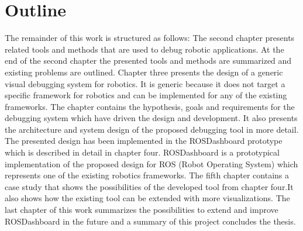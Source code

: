 \section{Outline}
The remainder of this work is structured as follows: The second chapter presents related tools and methods that are used to debug robotic applications. At the end of the second chapter the presented tools and methods are summarized and existing problems are outlined. Chapter three presents the design of a generic visual debugging system for robotics. It is generic because it does not target a specific framework for robotics and can be implemented for any of the existing frameworks. The chapter contains the hypothesis, goals and requirements for the debugging system which have driven the design and development. It also presents the architecture and system design of the proposed debugging tool in more detail. The presented design has been implemented in the ROSDashboard prototype which is described in detail in chapter four. ROSDashboard is a prototypical implementation of the proposed design for ROS (Robot Operating System) which represents one of the existing robotics frameworks. The fifth chapter contains a case study that shows the possibilities of the developed tool from chapter four.It also shows how the existing tool can be extended with more visualizations. The last chapter of this work summarizes the possibilities to extend and improve ROSDashboard in the future and a summary of this project concludes the thesis.
